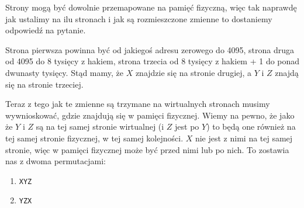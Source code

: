 Strony mogą być dowolnie przemapowane na pamięć fizyczną, więc tak naprawdę jak ustalimy na ilu stronach i jak są rozmieszczone zmienne to dostaniemy odpowiedź na pytanie.

Strona pierwsza powinna być od jakiegoś adresu zerowego do 4095, strona druga od 4095 do 8 tysięcy z hakiem, strona trzecia od 8 tysięcy z hakiem + 1 do ponad dwunasty tysięcy. Stąd mamy, że $X$ znajdzie się na stronie drugiej, a $Y$ i $Z$ znajdą się na stronie trzeciej.

Teraz z tego jak te zmienne są trzymane na wirtualnych stronach musimy wywnioskować, gdzie znajdują się w pamięci fizycznej. Wiemy na pewno, że jako że $Y$ i $Z$ są na tej samej stronie wirtualnej (i $Z$ jest po $Y$) to będą one również na tej samej stronie fizycznej, w tej samej kolejności. $X$ nie jest z nimi na tej samej stronie, więc w pamięci fizycznej może być przed nimi lub po nich. To zostawia nas z dwoma permutacjami:

\begin{enumerate}
	\item \texttt{XYZ}
	\item \texttt{YZX}
\end{enumerate}